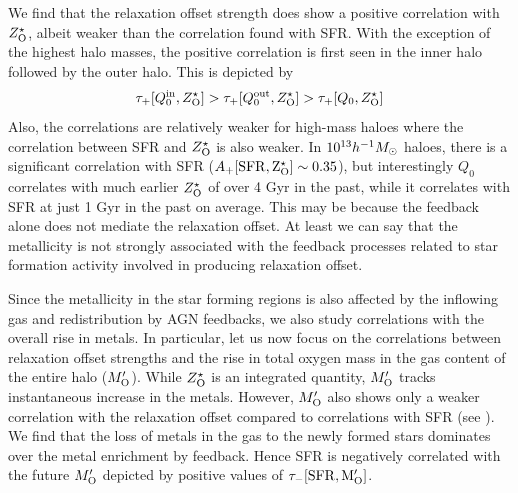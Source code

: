 

We find that the relaxation offset strength does show a positive correlation with $Z^{\star}_{\rm{O}}$, albeit weaker than the correlation found with SFR. 
With the exception of the highest halo masses, the positive correlation is first seen in the inner halo followed by the outer halo. This is depicted by 
\begin{align}
\tau_{+}[Q_0^{\rm{in}},Z^{\star}_{\rm{O}}] > \tau_{+}[Q_0^{\rm{out}},Z^{\star}_{\rm{O}}] > \tau_{+}[Q_0,Z^{\star}_{\rm{O}}]
\end{align}
Also, the correlations are relatively weaker for high-mass haloes where the correlation between SFR and $Z^{\star}_{\rm{O}}$ is also weaker. In $10^{13} h^{-1}M_{\odot}$ haloes, there is a significant correlation with SFR ($A_{+}[\rm{SFR},Z^{\star}_{\rm{O}}] \sim 0.35$), but interestingly $Q_0$ correlates with much earlier $Z^{\star}_{\rm{O}}$ of over 4 Gyr in the past, while it correlates with SFR at just 1 Gyr in the past on average.
This may be because the feedback alone does not mediate the relaxation offset. At least we can say that the metallicity is not strongly associated with the feedback processes related to star formation activity involved in producing relaxation offset.

Since the metallicity in the star forming regions is also affected by the inflowing gas and redistribution by AGN feedbacks, we also study correlations with the overall rise in metals. In particular, let us now focus on the correlations between relaxation offset strengths and the rise in total oxygen mass in the gas content of the entire halo ($M_{\rm{O}}'$).  While $Z^{\star}_{\rm{O}}$ is an integrated quantity, $M_{\rm{O}}'$ tracks instantaneous increase in the metals. However, $M_{\rm{O}}'$ also shows only a weaker correlation with the relaxation offset compared to correlations with SFR (see ). We find that the loss of metals in the gas to the newly formed stars dominates over the metal enrichment by feedback. Hence SFR is negatively correlated with the future $M_{\rm{O}}'$ 
depicted by positive values of $\tau_{-}[\rm{SFR},M_{\rm{O}}']$.

